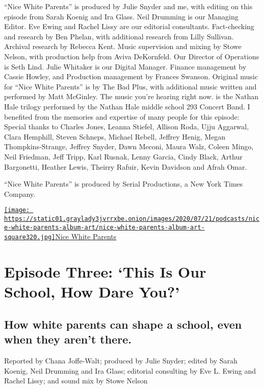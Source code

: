 ``Nice White Parents'' is produced by Julie Snyder and me, with editing
on this episode from Sarah Koenig and Ira Glass. Neil Drumming is our
Managing Editor. Eve Ewing and Rachel Lissy are our editorial
consultants. Fact-checking and research by Ben Phelan, with additional
research from Lilly Sullivan. Archival research by Rebecca Kent. Music
supervision and mixing by Stowe Nelson, with production help from Aviva
DeKornfeld. Our Director of Operations is Seth Lind. Julie Whitaker is
our Digital Manager. Finance management by Cassie Howley, and Production
management by Frances Swanson. Original music for ``Nice White Parents''
is by The Bad Plus, with additional music written and performed by Matt
McGinley. The music you're hearing right now. is the Nathan Hale trilogy
performed by the Nathan Hale middle school 293 Concert Band. I benefited
from the memories and expertise of many people for this episode: Special
thanks to Charles Jones, Leanna Stiefel, Allison Roda, Ujju Aggarwal,
Clara Hemphill, Steven Schneps, Michael Rebell, Jeffrey Henig, Megan
Thompkins-Strange, Jeffrey Snyder, Dawn Meconi, Maura Walz, Coleen
Mingo, Neil Friedman, Jeff Tripp, Karl Rusnak, Lenny Garcia, Cindy
Black, Arthur Bargonetti, Heather Lewis, Theirry Rafuir, Kevin Davidson
and Afrah Omar.

``Nice White Parents'' is produced by Serial Productions, a New York
Times Company.

\href{https://www.nytimes3xbfgragh.onion/column/nice-white-parents}{\texttt{[image: https://static01.graylady3jvrrxbe.onion/images/2020/07/21/podcasts/nice-white-parents-album-art/nice-white-parents-album-art-square320.jpg]}Nice
White Parents}

\hypertarget{episode-three-this-is-our-school-how-dare-you-1}{%
\section{Episode Three: `This Is Our School, How Dare
You?'}\label{episode-three-this-is-our-school-how-dare-you-1}}

\hypertarget{how-white-parents-can-shape-a-school-even-when-they-arent-there-1}{%
\subsection{How white parents can shape a school, even when they aren't
there.}\label{how-white-parents-can-shape-a-school-even-when-they-arent-there-1}}

Reported by Chana Joffe-Walt; produced by Julie Snyder; edited by Sarah
Koenig, Neil Drumming and Ira Glass; editorial consulting by Eve L.
Ewing and Rachel Lissy; and sound mix by Stowe Nelson

